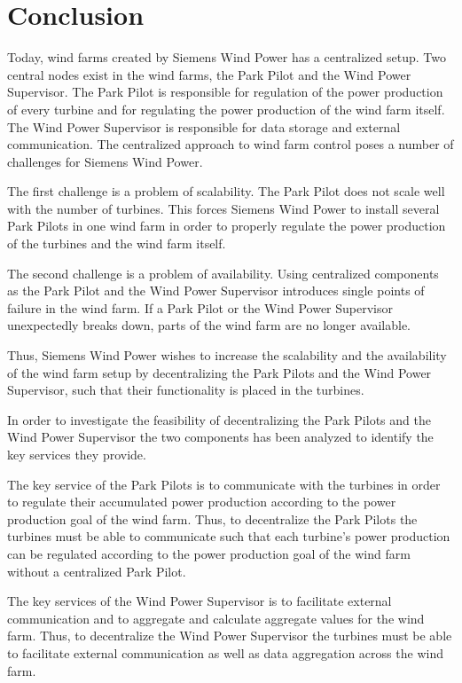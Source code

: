 \chapter{Conclusion}
Today, wind farms created by Siemens Wind Power has a centralized setup. Two central nodes exist in the wind farms, the Park Pilot and the Wind Power Supervisor. The Park Pilot is responsible for regulation of the power production of every turbine and for regulating the power production of the wind farm itself. The Wind Power Supervisor is responsible for data storage and external communication. The centralized approach to wind farm control poses a number of challenges for Siemens Wind Power.

The first challenge is a problem of scalability. The Park Pilot does not scale well with the number of turbines. This forces Siemens Wind Power to install several Park Pilots in one wind farm in order to properly regulate the power production of the turbines and the wind farm itself.

The second challenge is a problem of availability. Using centralized components as the Park Pilot and the Wind Power Supervisor introduces single points of failure in the wind farm. If a Park Pilot or the Wind Power Supervisor unexpectedly breaks down, parts of the wind farm are no longer available.

Thus, Siemens Wind Power wishes to increase the scalability and the availability of the wind farm setup by decentralizing the Park Pilots and the Wind Power Supervisor, such that their functionality is placed in the turbines.

In order to investigate the feasibility of decentralizing the Park Pilots and the Wind Power Supervisor the two components has been analyzed to identify the key services they provide.

The key service of the Park Pilots is to communicate with the turbines in order to regulate their accumulated power production according to the power production goal of the wind farm. Thus, to decentralize the Park Pilots the turbines must be able to communicate such that each turbine's power production can be regulated according to the power production goal of the wind farm without a centralized Park Pilot.

The key services of the Wind Power Supervisor is to facilitate external communication and to aggregate and calculate aggregate values for the wind farm. Thus, to decentralize the Wind Power Supervisor the turbines must be able to facilitate external communication as well as data aggregation across the wind farm.

